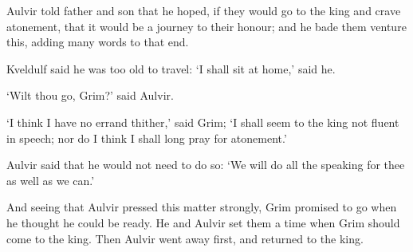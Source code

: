 Aulvir told father and son that he hoped, if they would go to the king and crave atonement, that it would be a journey to their honour; and he bade them venture this, adding many words to that end.

Kveldulf said he was too old to travel: `I shall sit at home,' said he.

`Wilt thou go, Grim?' said Aulvir.

`I think I have no errand thither,' said Grim; `I shall seem to the king not fluent in speech; nor do I think I shall long pray for atonement.'

Aulvir said that he would not need to do so: `We will do all the speaking for thee as well as we can.'

And seeing that Aulvir pressed this matter strongly, Grim promised to go when he thought he could be ready. He and Aulvir set them a time when Grim should come to the king. Then Aulvir went away first, and returned to the king.
